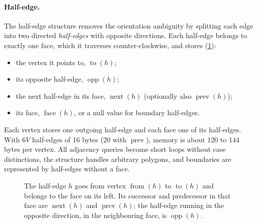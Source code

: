 \paragraph{Half-edge.} The half-edge structure \citep{Mantyla1988,Kettner1999} removes the
orientation ambiguity by splitting each edge into two directed \emph{half-edges} with opposite
directions. Each half-edge belongs to exactly one face, which it traverses counter-clockwise, and
stores (\cref{fig:halfedge}):
\begin{itemize}
  \item the vertex it points to, $\operatorname{to}(h)$;
  \item its opposite half-edge, $\operatorname{opp}(h)$;
  \item the next half-edge in its face, $\operatorname{next}(h)$ (optionally also
  $\operatorname{prev}(h)$);
  \item its face, $\operatorname{face}(h)$, or a null value for boundary half-edges.
\end{itemize}
Each vertex stores one outgoing half-edge and each face one of its half-edges. With $6V$
half-edges of 16 bytes (20 with $\operatorname{prev}$), memory is about $120$ to $144$ bytes per
vertex. All adjacency queries become short loops without case distinctions, the structure handles
arbitrary polygons, and boundaries are represented by half-edges without a face.

\begin{figure}[tbp]
\centering
{}
\caption{The half-edge $h$ goes from vertex $\operatorname{from}(h)$ to $\operatorname{to}(h)$ and
belongs to the face on its left. Its successor and predecessor in that face are
$\operatorname{next}(h)$ and $\operatorname{prev}(h)$; the half-edge running in the opposite
direction, in the neighbouring face, is $\operatorname{opp}(h)$.}
\label{fig:halfedge}
\end{figure}

